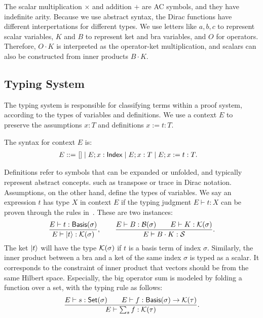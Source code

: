 The scalar multiplication $\times$ and addition $+$ are AC symbols, and they have indefinite arity. 
Because we use abstract syntax, the Dirac functions have different interpertations for different types. 
We use letters like $a, b, c$ to represent scalar variables, $K$ and $B$ to represent ket and bra variables, and $O$ for operators.
Therefore, $O \cdot K$ is interpreted as the operator-ket multiplication, and scalars can also be constructed from inner products $B \cdot K$.


\subsection{Typing System}
The typing system is responsible for classifying terms within a proof system, according to the types of variables and definitions. 
We use a context \( E \) to preserve the assumptions \( x : T \) and definitions \( x := t : T \).
\begin{definition}[Context]
    The syntax for context \( E \) is:
    \begin{align*}
        E ::= &\ [] \mid E; x : \mathsf{Index} \mid E; x : T \mid E; x := t : T.
    \end{align*}
\end{definition}
Definitions refer to symbols that can be expanded or unfolded, and typically represent abstract concepts. such as transpose or trace in Dirac notation. Assumptions, on the other hand, define the types of variables.
We say an expression \( t \) has type \( X \) in context \( E \) if the typing judgment \( E \vdash t : X \) can be proven through the rules in~. These are two instances:
\begin{gather*}
    \frac{E \vdash t : \mathsf{Basis}(\sigma)}{E \vdash \ket{t} : \mathcal{K}(\sigma)},
    \qquad
    \frac{E \vdash B : \mathcal{B}(\sigma) \qquad E \vdash K : \mathcal{K}(\sigma)}{E \vdash B \cdot K : \mathcal{S}}.
\end{gather*}
The ket \( \ket{t} \) will have the type \( \mathcal{K}(\sigma) \) if \( t \) is a basis term of index \( \sigma \). Similarly, the inner product between a bra and a ket of the same index \( \sigma \) is typed as a scalar. It corresponds to the constraint of inner product that vectors should be from the same Hilbert space.
Especially, the big operator sum is modeled by folding a function over a set, with the typing rule as follows:
\[
    \frac{E \vdash s : \mathsf{Set}(\sigma) \qquad E \vdash f : \mathsf{Basis}(\sigma) \to \mathcal{K}(\tau)}{E \vdash \sum_{s} f : \mathcal{K}(\tau)}.
\]

